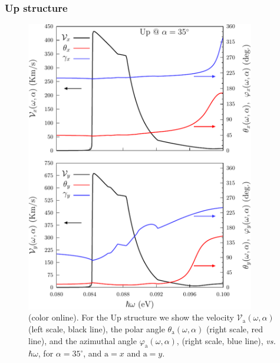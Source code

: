 \documentclass[floatfix,prb,aps,superscriptaddress,showpacs,11pt,preprint,letterpaper]{revtex4}
\def\tama{10cm}
\begin{document}
\subsubsection{Up structure}

\begin{figure}[t]
\centering
\includegraphics[width=\tama]{figures/fig7}
\caption{(color online). For the Up structure we show the velocity
$\mathcal{V}_{\mathrm{a}} (\omega,\alpha)$ (left scale, black line), the polar
angle $\theta_{\mathrm{a}} (\omega,\alpha)$ (right scale, red line), and  the
azimuthal angle $\varphi_{\mathrm{a}} (\omega,\alpha)$, (right scale, blue
line), {\it vs.} $\hbar\omega$, for $\alpha=35^\circ$, and $\mathrm{a}=x$ and
$\mathrm{a}=y$.}
\label{fig:up-vab-comp-rtp-1}
\end{figure}
\end{document}
